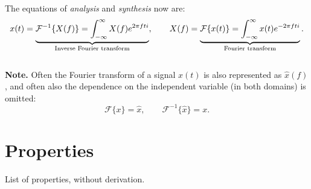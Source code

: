 The equations of \emph{analysis} and \emph{synthesis} now are:
\begin{equation}
    x(t) = \underbrace{\mathcal{F}^{-1} \{ X(f) \} = \int_{-\infty}^{\infty} X(f) e^{2 \pi f t i}}_{\mathclap{\text{Inverse Fourier transform}}}, \qquad X(f) = \underbrace{\mathcal{F}\{ x(t) \} = \int_{-\infty}^{\infty} x(t) e^{- 2 \pi f t i}}_{\mathcal{\text{Fourier transform}}}.
\end{equation}
\\

\textbf{Note.} Often the Fourier transform of a signal $x(t)$ is also represented as $\hat{x}(f)$, and often also the dependence on the independent variable (in both domains) is omitted:
\begin{equation}
    \mathcal{F} \{ x \} = \hat{x}, \qquad \mathcal{F}^{-1} \{ \hat{x} \} = x.
\end{equation}


\section{Properties}

List of properties, without derivation.

